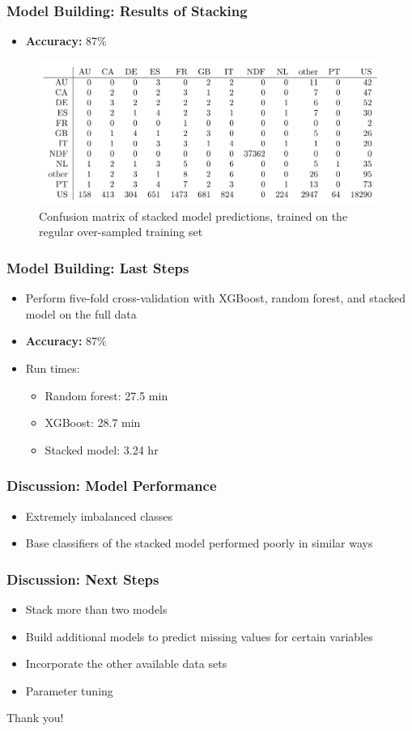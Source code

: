 \documentclass{beamer}
\begin{document}
\begin{frame}
\frametitle{Model Building: Results of Stacking}
\begin{itemize}
  \item \textbf{Accuracy:} 87\%
\end{itemize}
\begin{figure}
\includegraphics[width=1\linewidth]{stacked_confusion_m.png}
\caption{Confusion matrix of stacked model predictions, trained on the regular over-sampled training set}
\end{figure}
\end{frame}

\begin{frame}
\frametitle{Model Building: Last Steps}
\begin{itemize}
  \item Perform five-fold cross-validation with XGBoost, random forest, and stacked model on the full data 
  \item \textbf{Accuracy:} 87\%
  \item Run times: 
  \begin{itemize}
    \item Random forest: 27.5 min
    \item XGBoost: 28.7 min
    \item Stacked model: 3.24 hr
  \end{itemize}
\end{itemize}
\end{frame}

\begin{frame}
\frametitle{Discussion: Model Performance}
\begin{itemize}
  \item Extremely imbalanced classes
  \item Base classifiers of the stacked model performed poorly in similar ways
\end{itemize}
\end{frame}

\begin{frame}
\frametitle{Discussion: Next Steps}
\begin{itemize}
  \item Stack more than two models 
  \item Build additional models to predict missing values for certain variables
  \item Incorporate the other available data sets 
  \item Parameter tuning
\end{itemize}
\end{frame}

\begin{frame}
Thank you!
\end{frame}
\end{document}
